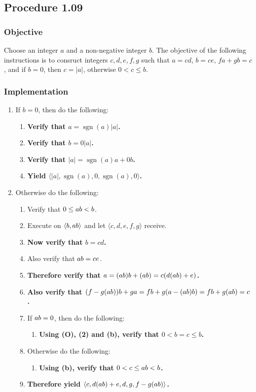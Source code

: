 \documentclass[twocolumn]{article}
\DeclareMathOperator{\sgn}{sgn}
\let\div\relax
\DeclareMathOperator{\div}{div}
\let\mod\relax
\DeclareMathOperator{\mod}{mod}
\newcommand{\procedure}[2][]{\subsection*{Procedure #2 \ifthenelse{\equal{#1}{}}{}{(#1)}}\label{sec:procedure #2}}
\newcommand{\objective}{\subsubsection*{Objective}}
\newcommand{\implementation}{\subsubsection*{Implementation}}
\newcommand{\procedurehr}[2][]{\hyperref[sec:procedure #2]{\ifthenelse{\equal{#1}{}}{procedure #2}{#1}}}
\begin{document}
		\procedure{1.09}
			\objective
				Choose an integer $a$ and a non-negative integer $b$. The objective of the following instructions is to consruct integers $c,d,e,f,g$ such that $a=cd$, $b=ce$, $fa+gb=c$, and if $b=0$, then $c=\lvert a\rvert$, otherwise $0<c\le b$.
			\implementation
				\begin{enumerate}
					\item If $b=0$, then do the following:
					\begin{enumerate}
						\item \textbf{Verify that $a=\sgn(a)\lvert a\rvert$.}
						\item \textbf{Verify that $b=0\lvert a\rvert$.}
						\item \textbf{Verify that $\lvert a\rvert=\sgn(a)a+0b$.}
						\item \textbf{Yield $\langle\lvert a\rvert,\sgn(a),0,\sgn(a),0\rangle$.}
					\end{enumerate}
					\item Otherwise do the following:
					\begin{enumerate}
						\item Verify that $0\le a\mod b<b$.
						\item Execute \procedurehr{1.09} on $\langle b,a\mod b\rangle$ and let $\langle c,d,e,f,g\rangle$ receive.
						\item \textbf{Now verify that $b=cd$.}
						\item Also verify that $a\mod b=ce$.
						\item \textbf{Therefore verify that $a=(a\div b)b+(a\mod b)=c(d(a\div b)+e)$.}
						\item \textbf{Also verify that $(f-g(a\div b))b+ga=fb+g(a-(a\div b)b)=fb+g(a\mod b)=c$.}
						\item If $a\mod b=0$, then do the following:
						\begin{enumerate}
							\item \textbf{Using (O), (2) and (b), verify that $0<b=c\le b$.}
						\end{enumerate}
						\item Otherwise do the following:
						\begin{enumerate}
							\item \textbf{Using (b), verify that $0<c\le a\mod b<b$.}
						\end{enumerate}
						\item \textbf{Therefore yield $\langle c,d(a\div b)+e,d,g,f-g(a\div b)\rangle$.}
					\end{enumerate}
				\end{enumerate}
\end{document}

